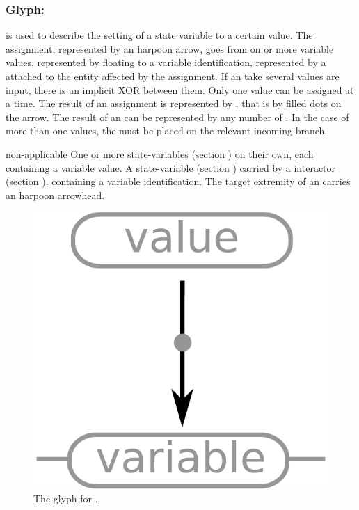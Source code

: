 \color{blue}

\subsubsection{Glyph: }\label{sec:assignment}

 is used to describe the setting of a state variable to a certain value. The assignment, represented by an harpoon arrow, goes from on or more variable values, represented by floating  to a variable identification, represented by a  attached to the entity affected by the assignment.   If an  take several  values are input, there is an implicit XOR between them. Only one value can be assigned at a time. The result of an assignment is represented by , that is by filled dots on the arrow. The result of an  can be represented by any number of . In the case of more than one  values, the  must be placed on the relevant incoming branch.

\begin{glyphDescription}
 \glyphSboTerm non-applicable
 \glyphOrigin One or more state-variables (section ) on their own, each containing a variable value.
 \glyphTarget A state-variable (section ) carried by a interactor (section ), containing a variable identification.
 \glyphEndPoint The target extremity of an  carries an harpoon arrowhead.
 \end{glyphDescription}

\begin{figure}[H]
  \centering
  \includegraphics[scale = 0.3]{images/assignment}
  \caption{The \ER glyph for .}
  \label{fig:assignment}
\end{figure}

